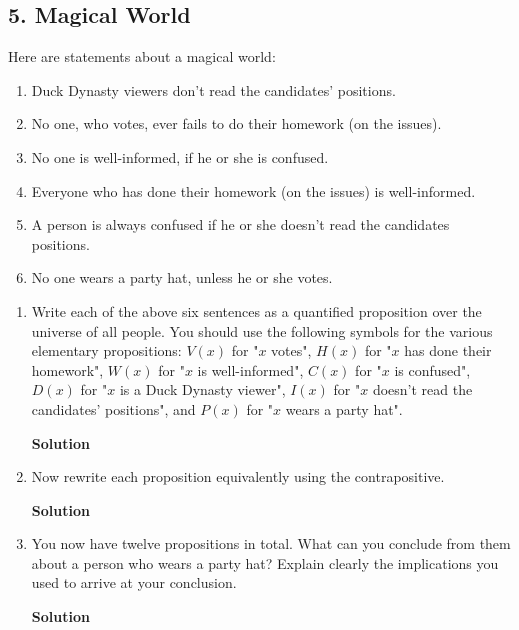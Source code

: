 \documentclass{article}
\begin{document}
\subsection*{5. Magical World}
Here are statements about a magical world:
\begin{enumerate}[I]
\item Duck Dynasty viewers don't read the candidates' positions.
\item No one, who votes, ever fails to do their homework (on the issues).
\item No one is well-informed, if he or she is confused.
\item Everyone who has done their homework (on the issues) is well-informed.
\item A person is always confused if he or she doesn't read the candidates positions.
\item No one wears a party hat, unless he or she votes.
\end{enumerate}
\begin{enumerate}
\item Write each of the above six sentences as a quantified proposition over the universe of all people. You should use the following symbols for the various elementary propositions: $V(x)$ for "$x$ votes", $H(x)$ for "$x$ has done their homework", $W(x)$ for "$x$ is well-informed", $C(x)$ for "$x$ is confused", $D(x)$ for "$x$ is a Duck Dynasty viewer", $I(x)$ for "$x$ doesn't read the candidates' positions", and $P(x)$ for "$x$ wears a party hat".
\begin{mdframed}
\textbf{Solution}
\end{mdframed}
\item Now rewrite each proposition equivalently using the contrapositive.
\begin{mdframed}
\textbf{Solution}
\end{mdframed}
\item  You now have twelve propositions in total. What can you conclude from them about
a person who wears a party hat? Explain clearly the implications you used to arrive at your
conclusion.
\begin{mdframed}
\textbf{Solution}
\end{mdframed}
\end{enumerate}
\end{document}
